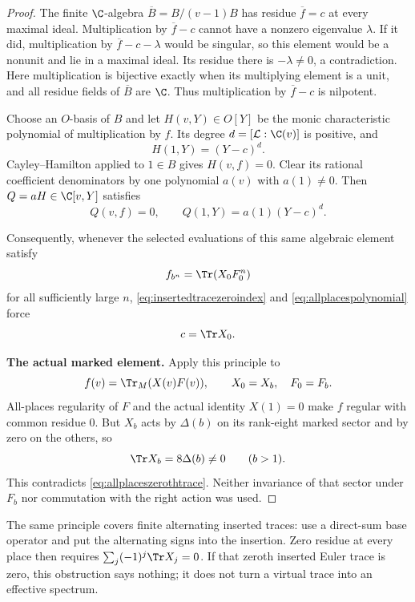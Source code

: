 \documentclass[11pt,a4paper]{article}
\theoremstyle{named}\newtheorem{finding}{Finding}[section]
\theoremstyle{definition}\newtheorem{definition}[finding]{Definition}
\theoremstyle{remark}\newtheorem{remark}[finding]{Remark}
\begin{document}
\begin{proof}
The finite $\C$-algebra $\overline B=B/(v-1)B$
has residue $\overline f=c$ at every maximal ideal.
Multiplication by $\overline f-c$ cannot have a
nonzero eigenvalue $\lambda$.
If it did, multiplication by $\overline f-c-\lambda$
would be singular, so this element would be a nonunit
and lie in a maximal ideal.
Its residue there is $-\lambda\ne0$, a contradiction.
Here multiplication is bijective exactly when its
multiplying element is a unit, and all residue fields
of $\overline B$ are $\C$.
Thus multiplication by $\overline f-c$ is nilpotent.

Choose an $O$-basis of $B$ and let $H(v,Y)\in O[Y]$
be the monic characteristic polynomial of multiplication
by $f$. Its degree $d=[\mathcal L:\C(v)]$ is positive,
and
\[
 H(1,Y)=(Y-c)^d.
\]
Cayley--Hamilton applied to $1\in B$ gives $H(v,f)=0$.
Clear its rational coefficient denominators by one
polynomial $a(v)$ with $a(1)\ne0$.
Then $Q=aH\in\C[v,Y]$ satisfies
\begin{equation}\label{eq:allplacespolynomial}
 Q(v,f)=0,\qquad Q(1,Y)=a(1)(Y-c)^d.
\end{equation}

Consequently, whenever the selected evaluations of
this same algebraic element satisfy
\[
 f_{b^n}=\Tr(X_0F_0^n)
\]
for all sufficiently large $n$,
\eqref{eq:insertedtracezeroindex} and
\eqref{eq:allplacespolynomial} force
\begin{equation}\label{eq:allplaceszerothtrace}
 c=\Tr X_0.
\end{equation}

\par\smallskip\noindent\textbf{The actual marked element.}\quad
Apply this principle to
\[
 f(v)=\Tr_M(X(v)F(v)),\qquad X_0=X_b,\quad F_0=F_b.
\]
All-places regularity of $F$ and the actual identity
$X(1)=0$ make $f$ regular with common residue $0$.
But $X_b$ acts by $\Delta(b)$ on its rank-eight
marked sector and by zero on the others, so
\[
 \Tr X_b=8\Delta(b)\ne0\qquad(b>1).
\]
This contradicts \eqref{eq:allplaceszerothtrace}.
Neither invariance of that sector under $F_b$ nor
commutation with the right action was used.
\end{proof}

The same principle covers finite alternating inserted
traces: use a direct-sum base operator and put the
alternating signs into the insertion.
Zero residue at every place then requires
$\sum_j(-1)^j\Tr X_j=0$.
If that zeroth inserted Euler trace is zero,
this obstruction says nothing; it does not turn
a virtual trace into an effective spectrum.
\end{document}
